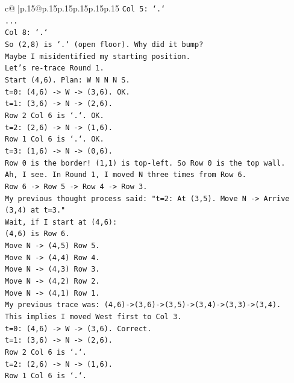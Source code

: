 \documentclass{article}
\begin{document}
{\begin{supertabular}{c@{$\;$}|p{.15\linewidth}@{}p{.15\linewidth}p{.15\linewidth}p{.15\linewidth}p{.15\linewidth}p{.15\linewidth}}
{{{\texttt{Col 5: `.`} \\
\texttt{...} \\
\texttt{Col 8: `.`} \\
\texttt{So (2,8) is `.` (open floor). Why did it bump?} \\
\texttt{Maybe I misidentified my starting position.} \\
\texttt{Let's re{-}trace Round 1.} \\
\texttt{Start (4,6). Plan: W N N N S.} \\
\texttt{t=0: (4,6) {-}> W {-}> (3,6). OK.} \\
\texttt{t=1: (3,6) {-}> N {-}> (2,6).} \\
\texttt{Row 2 Col 6 is `.`. OK.} \\
\texttt{t=2: (2,6) {-}> N {-}> (1,6).} \\
\texttt{Row 1 Col 6 is `.`. OK.} \\
\texttt{t=3: (1,6) {-}> N {-}> (0,6).} \\
\texttt{Row 0 is the border! (1,1) is top{-}left. So Row 0 is the top wall.} \\
\texttt{Ah, I see. In Round 1, I moved N three times from Row 6.} \\
\texttt{Row 6 {-}> Row 5 {-}> Row 4 {-}> Row 3.} \\
\texttt{My previous thought process said: "t=2: At (3,5). Move N {-}> Arrive (3,4) at t=3."} \\
\texttt{Wait, if I start at (4,6):} \\
\texttt{(4,6) is Row 6.} \\
\texttt{Move N {-}> (4,5) Row 5.} \\
\texttt{Move N {-}> (4,4) Row 4.} \\
\texttt{Move N {-}> (4,3) Row 3.} \\
\texttt{Move N {-}> (4,2) Row 2.} \\
\texttt{Move N {-}> (4,1) Row 1.} \\
\texttt{My previous trace was: (4,6){-}>(3,6){-}>(3,5){-}>(3,4){-}>(3,3){-}>(3,4).} \\
\texttt{This implies I moved West first to Col 3.} \\
\texttt{t=0: (4,6) {-}> W {-}> (3,6). Correct.} \\
\texttt{t=1: (3,6) {-}> N {-}> (2,6).} \\
\texttt{Row 2 Col 6 is `.`.} \\
\texttt{t=2: (2,6) {-}> N {-}> (1,6).} \\
\texttt{Row 1 Col 6 is `.`.} \\
}}}
\end{supertabular}}
\end{document}
